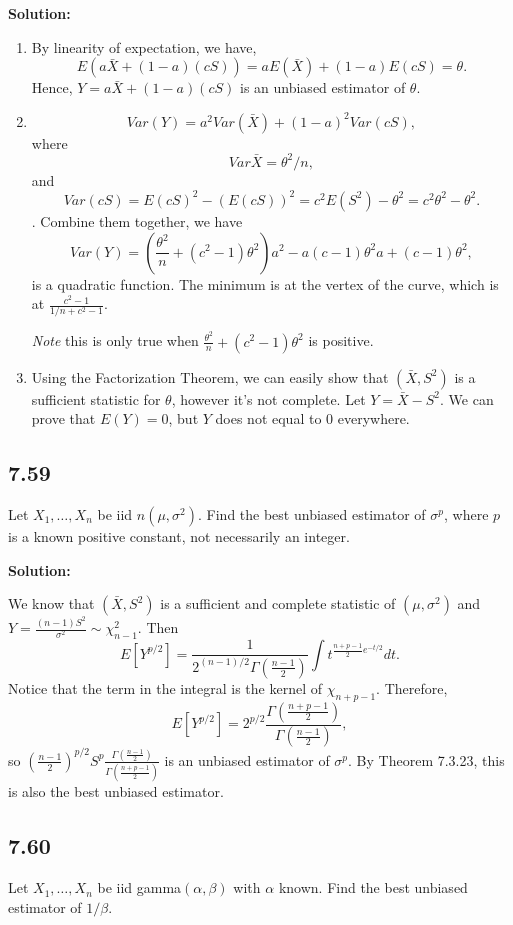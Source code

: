 \documentclass[11pt]{article}
\newcommand{\Sol}{\par {\bf Solution:}}
\newcommand{\sample}[1]{#1_1 , \dots , #1_n}
\begin{document}
\Sol
\begin{enumerate}[label=(\alph*)]
    \item
    By linearity of expectation, we have,
    \[
    E(a\bar X + (1-a)(cS)) = aE(\bar X) + (1-a)E(cS) = \theta.
    \]
    Hence, $Y = a\bar X + (1-a)(cS)$ is an unbiased estimator of $\theta$.
    
    \item
    \[
    Var(Y) = a^2 Var(\bar X) + (1-a)^2Var(cS),
    \]
    where
    \[
    Var \bar X = \theta^2/n,
    \]
    and 
    \[
    Var(cS) = E(cS)^2 - (E(cS))^2 = c^2E(S^2) - \theta^2 = c^2\theta^2 - \theta^2.
    \].
    Combine them together, we have
    \[
    Var(Y) = (\frac{\theta^2}{n} + (c^2-1)\theta^2)a^2 - a(c-1)\theta^2a + (c-1)\theta^2,
    \]
    is a quadratic function.
    The minimum is at the vertex of the curve, which is at $\frac{c^2-1}{1/n + c^2 - 1}$.

    \emph{Note} this is only true when $\frac{\theta^2}{n} + (c^2-1)\theta^2$ is positive.
    \item
    Using the Factorization Theorem, we can easily show that $(\bar X, S^2)$ is a sufficient statistic for $\theta$, however it's not complete. Let $Y = \bar X - S^2$. We can prove that $E(Y) = 0$, but $Y$ does not equal to 0 everywhere.
\end{enumerate}

\subsection*{7.59}
Let $\sample X$ be iid $n(\mu, \sigma^2)$. Find the best unbiased estimator of $\sigma^p$, where $p$ is a known positive constant, not necessarily an integer.

\Sol

We know that $(\bar X, S^2)$ is a sufficient and complete statistic of $(\mu, \sigma^2)$ and $Y = \frac{(n-1)S^2}{\sigma^2} \sim \chi_{n-1}^2$.
Then
\[
E [Y^{p/2}] = \frac{1}{2^{(n-1)/2}\Gamma(\frac{n-1}{2})} \int t^{\frac{n+p-1}{2}e^{-t/2}}dt.
\]
Notice that the term in the integral is the kernel of $\chi_{n+p-1}$. Therefore, 
\[
E[Y^{p/2}] = 2^{p/2}\frac{\Gamma(\frac{n+p-1}{2})}{\Gamma(\frac{n-1}{2})},
\]
so $(\frac{n-1}{2})^{p/2}S^p\frac{\Gamma(\frac{n-1}{2})}{\Gamma(\frac{n+p-1}{2})}$ is an unbiased estimator of $\sigma^p$. By Theorem 7.3.23, this is also the best unbiased estimator.

\subsection*{7.60}
Let $\sample X$ be iid gamma$(\alpha, \beta)$ with $\alpha$ known. Find the best unbiased estimator of $1/\beta$.
\end{document}
